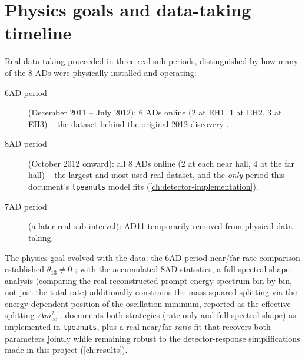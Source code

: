\section{Physics goals and data-taking timeline}

\begin{theorybox}
Real data taking proceeded in three real sub-periods, distinguished by how
many of the 8 ADs were physically installed and operating:
\begin{description}
  \item[6AD period] (December 2011 -- July 2012): 6 ADs online (2 at EH1,
    1 at EH2, 3 at EH3) -- the dataset behind the original 2012 discovery
    \parencite{An2012DayaBayDiscovery}.
  \item[8AD period] (October 2012 onward): all 8 ADs online (2 at each near
    hall, 4 at the far hall) -- the largest and most-used real dataset, and
    the \emph{only} period this document's \texttt{tpeanuts} model fits
    (\cref{ch:detector-implementation}).
  \item[7AD period] (a later real sub-interval): AD11 temporarily removed
    from physical data taking.
\end{description}
The physics goal evolved with the data: the 6AD-period near/far rate
comparison established $\theta_{13}\neq0$
\parencite{An2012DayaBayDiscovery}; with the accumulated 8AD statistics, a
full spectral-shape analysis (comparing the real reconstructed
prompt-energy spectrum bin by bin, not just the total rate) additionally
constrains the mass-squared splitting via the energy-dependent position of
the oscillation minimum, reported as the effective splitting $\Delta
m^2_{ee}$ \parencite{An2023DayaBayPrecision}. 
documents both strategies (rate-only and full-spectral-shape) as
implemented in \texttt{tpeanuts}, plus a real near/far \emph{ratio} fit
that recovers both parameters jointly while remaining robust to the
detector-response simplifications made in this project
(\cref{ch:results}).
\end{theorybox}
